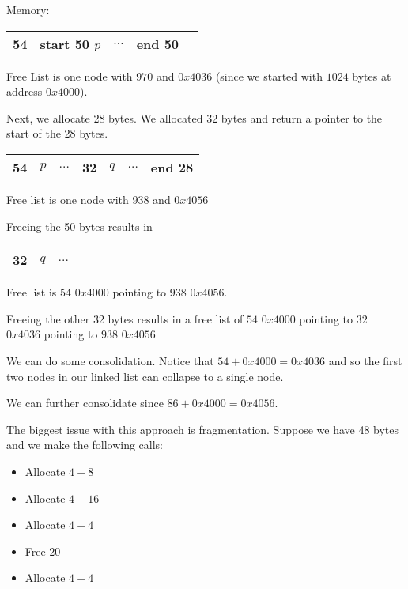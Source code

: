 \documentclass{article}
\begin{document}
Memory:


\begin{table}[h]
    \centering
    \begin{tabular}{|c|c|c|c|c|}\hline
        54 & start 50 $p$ & $\ldots$ & end 50 & \\\hline
    \end{tabular}
    
\end{table}

Free List is one node with \(970\) and \(0x4036\) (since we started with
\(1024\) bytes at address \(0x4000\)).

Next, we allocate 28 bytes. We allocated 32 bytes and return a pointer
to the start of the 28 bytes.

\begin{table}[h]
    \centering
    \begin{tabular}{|c|c|c|c|c|c|c|}\hline
        54 & $p$ & $\ldots$ & 32 & $q$ & $\ldots$ & end 28 \\\hline
    \end{tabular}
    
\end{table}

Free list is one node with \(938\) and \(0x4056\)

Freeing the 50 bytes results in

\begin{table}[h]
    \centering
    \begin{tabular}{|c|c|c|}\hline
        32 & $q$ & $\ldots$ \\\hline
    \end{tabular}
    
\end{table}

Free list is \(54\) \(0x4000\) pointing to \(938\) \(0x4056\).

Freeing the other 32 bytes results in a free list of \(54\) \(0x4000\)
pointing to \(32\) \(0x4036\) pointing to \(938\) \(0x4056\)

We can do some consolidation. Notice that \(54 + 0x4000 = 0x4036\) and
so the first two nodes in our linked list can collapse to a single node.

We can further consolidate since \(86 + 0x4000 = 0x4056\).

The biggest issue with this approach is fragmentation. Suppose we have
48 bytes and we make the following calls:

\begin{itemize}
    \item Allocate \(4 + 8\)
    \item Allocate \(4 + 16\)
    \item Allocate \(4 + 4\)
    \item Free \(20\)
    \item Allocate
\(4 + 4\)
\end{itemize}
\end{document}
